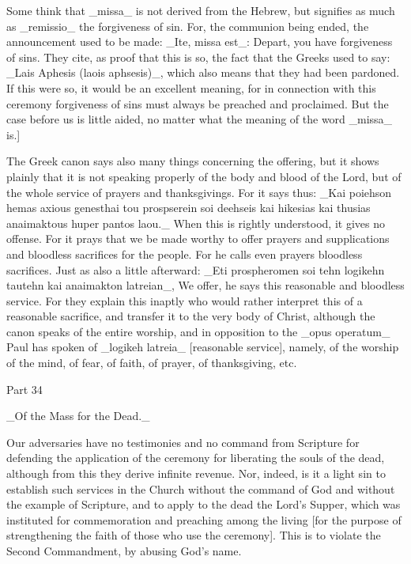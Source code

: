 Some think that _missa_ is not derived from the Hebrew, but signifies
as much as _remissio_ the forgiveness of sin.  For, the communion
being ended, the announcement used to be made: _Ite, missa est_:
Depart, you have forgiveness of sins.  They cite, as proof that this
is so, the fact that the Greeks used to say: _Lais Aphesis (laois
aphsesis)_, which also means that they had been pardoned.  If this
were so, it would be an excellent meaning, for in connection with
this ceremony forgiveness of sins must always be preached and
proclaimed.  But the case before us is little aided, no matter what
the meaning of the word _missa_ is.]

The Greek canon says also many things concerning the offering, but it
shows plainly that it is not speaking properly of the body and blood
of the Lord, but of the whole service of prayers and thanksgivings.
For it says thus: _Kai poiehson hemas axious genesthai tou
prospserein soi deehseis kai hikesias kai thusias anaimaktous huper
pantos laou._ When this is rightly understood, it gives no offense.
For it prays that we be made worthy to offer prayers and
supplications and bloodless sacrifices for the people.  For he calls
even prayers bloodless sacrifices.  Just as also a little afterward:
_Eti prospheromen soi tehn logikehn tautehn kai anaimakton latreian_,
We offer, he says this reasonable and bloodless service.  For they
explain this inaptly who would rather interpret this of a reasonable
sacrifice, and transfer it to the very body of Christ, although the
canon speaks of the entire worship, and in opposition to the _opus
operatum_ Paul has spoken of _logikeh latreia_ [reasonable service],
namely, of the worship of the mind, of fear, of faith, of prayer, of
thanksgiving, etc.




Part 34


_Of the Mass for the Dead._

Our adversaries have no testimonies and no command from Scripture for
defending the application of the ceremony for liberating the souls of
the dead, although from this they derive infinite revenue.  Nor,
indeed, is it a light sin to establish such services in the Church
without the command of God and without the example of Scripture, and
to apply to the dead the Lord's Supper, which was instituted for
commemoration and preaching among the living [for the purpose of
strengthening the faith of those who use the ceremony].  This is to
violate the Second Commandment, by abusing God's name.

